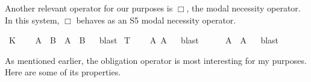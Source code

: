 \begin{isabellebody}
{\isafolddocument}%
%
\isadelimdocument
%
\endisadelimdocument
%
\begin{isamarkuptext}%
Another relevant operator for our purposes is $\Box$, the modal necessity operator. In 
this system, $\Box$ behaves as an S5 \cite{cresswell} modal necessity operator.%
\end{isamarkuptext}\isamarkuptrue%
\isamarkupfalse%
\ K{\isacharcolon}\isanewline
\ \ \ {\isachardoublequoteopen}{\isasymTurnstile}\ {\isacharparenleft}{\isacharparenleft}{\isasymbox}{\isacharparenleft}A\ \isactrlbold {\isasymrightarrow}\ B{\isacharparenright}{\isacharparenright}\ \isactrlbold {\isasymrightarrow}\ {\isacharparenleft}{\isacharparenleft}{\isasymbox}A{\isacharparenright}\ \isactrlbold {\isasymrightarrow}\ {\isacharparenleft}{\isasymbox}B{\isacharparenright}{\isacharparenright}{\isacharparenright}{\isachardoublequoteclose}%
\isadelimproof
\ %
\endisadelimproof
%
\isatagproof
{}\isamarkupfalse%
\ blast%
\endisatagproof
{\isafoldproof}%
%
\isadelimproof
%
\endisadelimproof
\isanewline
\isanewline
{}\isamarkupfalse%
\ T{\isacharcolon}\isanewline
\ \ \ {\isachardoublequoteopen}{\isasymTurnstile}\ {\isacharparenleft}{\isacharparenleft}{\isasymbox}A{\isacharparenright}\ \isactrlbold {\isasymrightarrow}A{\isacharparenright}{\isachardoublequoteclose}%
\isadelimproof
\ %
\endisadelimproof
%
\isatagproof
{}\isamarkupfalse%
\ blast%
\endisatagproof
{\isafoldproof}%
%
\isadelimproof
%
\endisadelimproof
\isanewline
\isanewline
{}\isamarkupfalse%
\ {}{\isacharcolon}\isanewline
\ \ \ {\isachardoublequoteopen}{\isasymTurnstile}\ {\isacharparenleft}{\isacharparenleft}{\isasymdiamond}A{\isacharparenright}\ \isactrlbold {\isasymrightarrow}\ {\isacharparenleft}{\isasymbox}{\isacharparenleft}{\isasymdiamond}A{\isacharparenright}{\isacharparenright}{\isacharparenright}{\isachardoublequoteclose}%
\isadelimproof
\ %
\endisadelimproof
%
\isatagproof
{}\isamarkupfalse%
\ blast\isanewline
%
\endisatagproof
{\isafoldproof}%
%
\isadelimproof
%
\endisadelimproof
%
\isadelimdocument
%
\endisadelimdocument
%
\isatagdocument
%
\endisatagdocument
{\isafolddocument}%
%
\isadelimdocument
%
\endisadelimdocument
%
\begin{isamarkuptext}%
As mentioned earlier, the obligation operator is most interesting for my purposes. Here are some 
of its properties.%
\end{isamarkuptext}\isamarkuptrue%
\isamarkupfalse%

\end{isabellebody}
